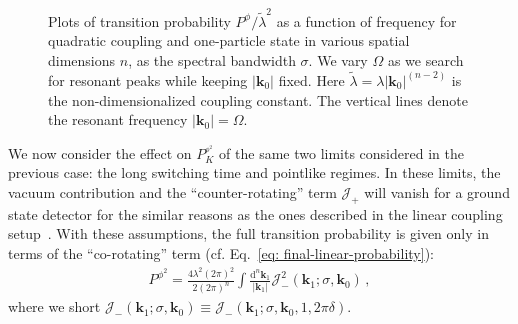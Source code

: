 \documentclass[11pt,prd,onecolumn,superscriptaddress,nofootinbib,floatfix,amsmath,amssymb]{revtex4-2}
\newcommand{\bk}{{\bm{k}}}
\newcommand{\dd}{\textrm{d}}
\begin{document}
\begin{figure}[htp]
        \caption{
        Plots of transition probability $P^\phi/\tilde{\lambda}^2$ as a function of frequency for quadratic coupling and one-particle state in various spatial dimensions $n$, as the spectral bandwidth $\sigma$. We vary $\Omega$ as we search for resonant peaks while keeping $|\bk_0|$ fixed. Here $\tilde\lambda = \lambda|\bk_0|^{(n-2)}$ is the non-dimensionalized coupling constant. The vertical lines denote the resonant frequency $|\bk_0|=\Omega$.
        }
    \label{fig: quad_resonance1}
    \end{figure}
    	
    We now consider the effect on $P_K^{_{\phi^2}}$ of the same two limits considered in the previous case: the long switching time and pointlike regimes. In these limits, the vacuum contribution and the ``counter-rotating'' term $\mathcal{J}_+$  will vanish for a ground state detector for the similar reasons as the ones described in the linear coupling setup~\cite{Allison2017a}. With these assumptions, the full transition probability is given only in terms of the ``co-rotating'' term (cf. Eq.~\eqref{eq: final-linear-probability}):
	\begin{align}
	    P^{\phi^2} = \frac{4\lambda^2(2\pi)^2}{2(2\pi)^n}\int \frac{\dd^n\bk_1}{|\bk_1|}\mathcal{J}^2_-(\bk_1; \sigma,\bk_0)\,,
    	\label{eq: final-quad-probability}
    \end{align}
    where we short $\mathcal{J}_-(\bk_1; \sigma,\bk_0)\equiv \mathcal{J}_-(\bk_1; \sigma,\bk_0, 1,2\pi\delta )$.
    
\end{document}
